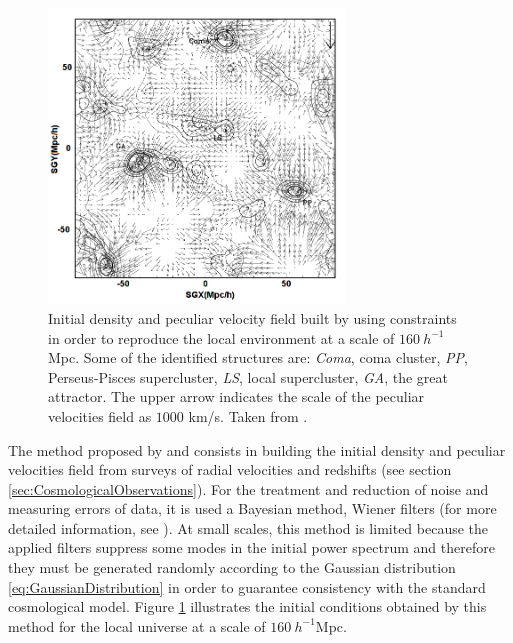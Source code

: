 \begin{figure}[htbp]
	\centering
	\includegraphics[width=0.70\textwidth]
	{./figures/3_nbody_simulations/Constrained_Construction.png}

	\caption{\small{Initial density and peculiar velocity field built by 
	using constraints in order to reproduce the local environment at a 
	scale of $160\ h^{-1}$Mpc. Some of the identified structures are:
	\textit{Coma}, coma cluster, \textit{PP}, Perseus-Pisces supercluster,
	\textit{LS}, local supercluster, \textit{GA}, the great attractor. 
	The upper arrow indicates the scale of the peculiar velocities field 
	as $1000$ km/s. Taken from \cite{Klypin2003}.}}
	
	\label{fig:Constrained_Construction}
\end{figure}


The method proposed by \cite{Klypin2003} and \cite{Hoffman1991} consists in
building the initial density and peculiar velocities field from surveys of 
radial velocities and redshifts (see section 
\ref{sec:CosmologicalObservations}). For the treatment and reduction of 
noise and measuring errors of data, it is used a Bayesian method, 
Wiener filters (for more detailed information, see \cite{Zaroubi1999}).
At small scales, this method is limited because the applied filters 
suppress some modes in the initial power spectrum and therefore they must
be generated randomly according to the Gaussian distribution 
\ref{eq:GaussianDistribution} in order to guarantee consistency with the
standard cosmological model. Figure \ref{fig:Constrained_Construction} 
illustrates the initial conditions obtained by this method for the local
universe at a scale of $160\ h^{-1}$Mpc.


